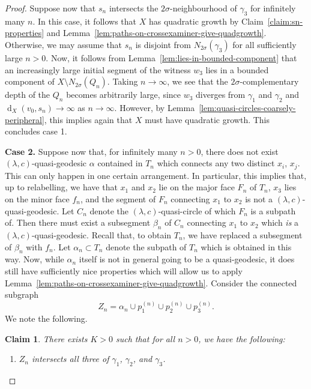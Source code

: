 \documentclass[11pt,a4paper]{amsart}
\DeclareMathOperator{\dist}{d}
\newtheorem{claim}[theorem]{Claim}
\theoremstyle{definition}
\begin{document}
\begin{proof}
    Suppose now that $s_n$ intersects the $2\sigma$-neighbourhood of $\gamma_3$ for infinitely many $n$. In this case, it follows that $X$ has quadratic growth by Claim~\ref{claim:sn-properties} and Lemma~\ref{lem:paths-on-crossexaminer-give-quadgrowth}. Otherwise, we may assume that $s_n$ is disjoint from $N_{2\sigma}(\gamma_3)$ for all sufficiently large $n > 0$. Now, it follows from Lemma~\ref{lem:lies-in-bounded-component} that an increasingly large initial segment of the witness $w_3$ lies in a bounded component of $X \setminus N_{2\sigma}(Q_n)$. Taking $n \to \infty$, we see that the $2\sigma$-complementary depth of the $Q_n$ becomes arbitrarily large, since $w_3$ diverges from $\gamma_1$ and $\gamma_2$ and $\dist_X(v_0, s_n) \to \infty$ as $n \to \infty$. However, by Lemma~\ref{lem:quasi-circles-coarsely-peripheral}, this implies again that $X$ must have quadratic growth. This concludes case 1. 
    

    \medskip

    \textbf{Case 2.} Suppose now that, for infinitely many $n > 0$, there does not exist $(\lambda,c)$-quasi-geodesic $\alpha$ contained in $T_n$ which connects any two distinct $x_i$, $x_j$.
    This can only happen in one certain arrangement. In particular, this implies that, up to relabelling, we have that $x_1$ and $x_2$ lie on the major face $F_n$ of $T_n$, $x_3$ lies on the minor face $f_n$, and the segment of $F_n$ connecting $x_1$ to $x_2$ is not a $(\lambda,c)$-quasi-geodesic. Let $C_n$ denote the $(\lambda,c)$-quasi-circle of which $F_n$ is a subpath of. Then there must exist a subsegment $\beta_n$ of $C_n$ connecting $x_1$ to $x_2$ which \emph{is} a $(\lambda,c)$-quasi-geodesic. Recall that, to obtain $T_n$, we have replaced a subsegment of $\beta_n$ with $f_n$. Let $\alpha_n \subset T_n$ denote the subpath of $T_n$ which is obtained in this way. Now, while $\alpha_n$ itself is not in general going to be a quasi-geodesic, it does still have sufficiently nice properties which will allow us to apply Lemma~\ref{lem:paths-on-crossexaminer-give-quadgrowth}. 
    Consider the connected subgraph 
    $$
    Z_n = \alpha_n \cup p^{(n)}_1 \cup p^{(n)}_2 \cup p^{(n)}_3.
    $$
    We note the following.

    \begin{claim}\label{claim:Zn properties}
        There exists $K > 0$ such that for all $n > 0$, we have the following:
        \begin{enumerate}
            \item $Z_n$ intersects all three of $\gamma_1$, $\gamma_2$, and $\gamma_3$. 


\end{enumerate}
\end{claim}
\end{proof}
\end{document}
